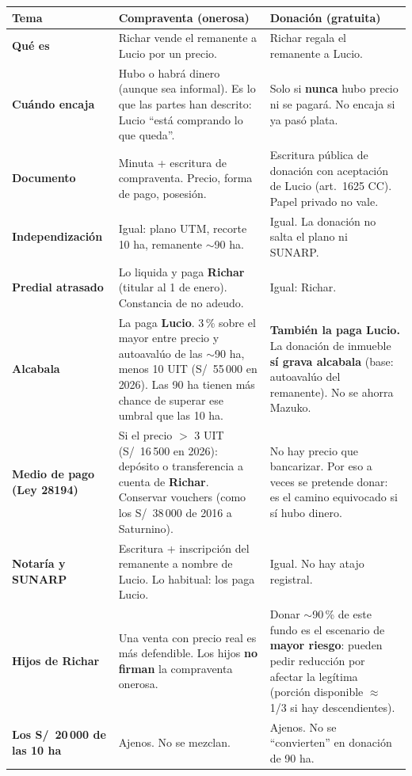 \documentclass[12pt,a4paper]{article}
\begin{document}
{\small\renewcommand{\arraystretch}{1.22}
\noindent\begin{tabularx}{\textwidth}{>{\bfseries}p{3.15cm} >{\raggedright\arraybackslash}p{5.55cm} X}
\toprule
Tema & Compraventa (onerosa) & Donación (gratuita) \\
\midrule
Qué es & Richar vende el remanente a Lucio por un precio. & Richar regala el remanente a Lucio. \\
Cuándo encaja & Hubo o habrá dinero (aunque sea informal). Es lo que las partes han descrito: Lucio ``está comprando lo que queda''. & Solo si \textbf{nunca} hubo precio ni se pagará. No encaja si ya pasó plata. \\
Documento & Minuta + escritura de compraventa. Precio, forma de pago, posesión. & Escritura pública de donación con aceptación de Lucio (art.\ 1625 CC). Papel privado no vale. \\
Independización & Igual: plano UTM, recorte 10 ha, remanente $\sim$90 ha. & Igual. La donación no salta el plano ni SUNARP. \\
Predial atrasado & Lo liquida y paga \textbf{Richar} (titular al 1 de enero). Constancia de no adeudo. & Igual: Richar. \\
Alcabala & La paga \textbf{Lucio}. 3\,\% sobre el mayor entre precio y autoavalúo de las $\sim$90 ha, menos 10 UIT (S/\ 55\,000 en 2026). Las 90 ha tienen más chance de superar ese umbral que las 10 ha. & \textbf{También la paga Lucio.} La donación de inmueble \textbf{sí grava alcabala} (base: autoavalúo del remanente). No se ahorra Mazuko. \\
Medio de pago (Ley 28194) & Si el precio $>$ 3 UIT (S/\ 16\,500 en 2026): depósito o transferencia a cuenta de \textbf{Richar}. Conservar vouchers (como los S/\ 38\,000 de 2016 a Saturnino). & No hay precio que bancarizar. Por eso a veces se pretende donar: es el camino equivocado si sí hubo dinero. \\
Notaría y SUNARP & Escritura + inscripción del remanente a nombre de Lucio. Lo habitual: los paga Lucio. & Igual. No hay atajo registral. \\
Hijos de Richar & Una venta con precio real es más defendible. Los hijos \textbf{no firman} la compraventa onerosa. & Donar $\sim$90\,\% de este fundo es el escenario de \textbf{mayor riesgo}: pueden pedir reducción por afectar la legítima (porción disponible $\approx$ 1/3 si hay descendientes). \\
Los S/\ 20\,000 de las 10 ha & Ajenos. No se mezclan. & Ajenos. No se ``convierten'' en donación de 90 ha. \\

\end{tabularx}}
\end{document}
